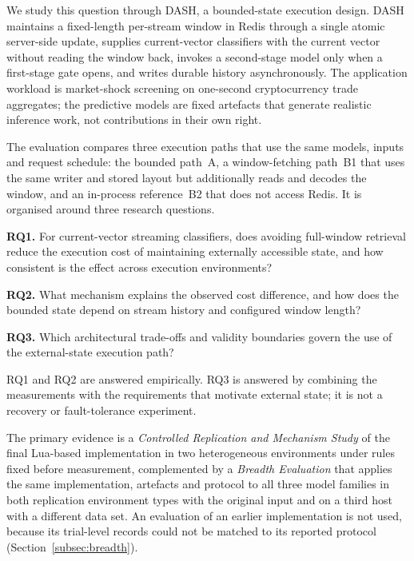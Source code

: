 \documentclass[a4paper,fleqn]{cas-dc}
\begin{document}
We study this question through DASH, a bounded-state execution design. DASH maintains a fixed-length per-stream window in Redis through a single atomic server-side update, supplies current-vector classifiers with the current vector without reading the window back, invokes a second-stage model only when a first-stage gate opens, and writes durable history asynchronously. The application workload is market-shock screening on one-second cryptocurrency trade aggregates; the predictive models are fixed artefacts that generate realistic inference work, not contributions in their own right.

The evaluation compares three execution paths that use the same models, inputs and request schedule: the bounded path~A, a window-fetching path~B1 that uses the same writer and stored layout but additionally reads and decodes the window, and an in-process reference~B2 that does not access Redis. It is organised around three research questions.

\textbf{RQ1.} For current-vector streaming classifiers, does avoiding full-window retrieval reduce the execution cost of maintaining externally accessible state, and how consistent is the effect across execution environments?

\textbf{RQ2.} What mechanism explains the observed cost difference, and how does the bounded state depend on stream history and configured window length?

\textbf{RQ3.} Which architectural trade-offs and validity boundaries govern the use of the external-state execution path?


RQ1 and RQ2 are answered empirically. RQ3 is answered by combining the measurements with the requirements that motivate external state; it is not a recovery or fault-tolerance experiment.

The primary evidence is a \emph{Controlled Replication and Mechanism Study} of the final Lua-based implementation in two heterogeneous environments under rules fixed before measurement, complemented by a \emph{Breadth Evaluation} that applies the same implementation, artefacts and protocol to all three model families in both replication environment types with the original input and on a third host with a different data set. An evaluation of an earlier implementation is not used, because its trial-level records could not be matched to its reported protocol (Section~\ref{subsec:breadth}).
\end{document}
